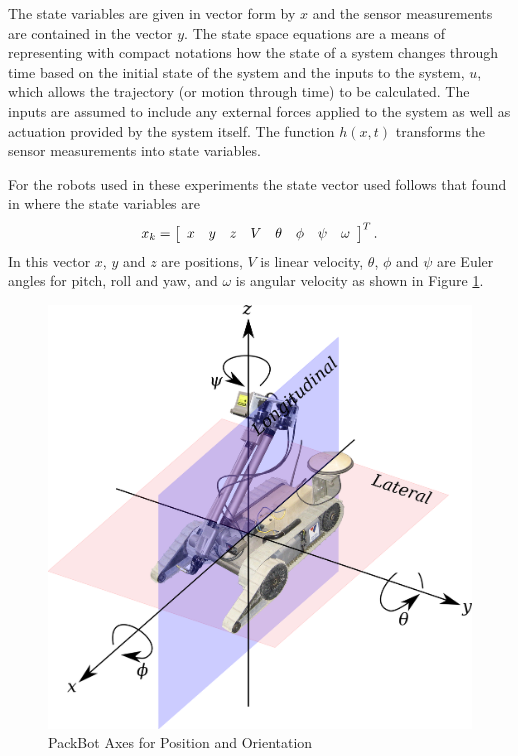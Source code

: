 The state variables are given in vector form by $x$ and the sensor measurements are contained in the vector $y$. The state space equations are a means of representing with compact notations how the state of a system changes through time based on the initial state of the system and the inputs to the system, $u$, which allows the trajectory (or motion through time) to be calculated. The inputs are assumed to include any external forces applied to the system as well as actuation provided by the system itself. The function $h(x,t)$ transforms the sensor measurements into state variables.

For the robots used in these experiments the state vector used follows that found in \cite{Kelly_1994_338, Kelly_1994_333} where the state variables are
\begin{align*}
x_k = \left[\begin{array}{c c c c c c c c} x & y & z & V & \theta & \phi & \psi & \omega \end{array}\right]^T.
\end{align*}
In this vector $x$, $y$ and $z$ are positions, $V$ is linear velocity, $\theta$, $\phi$ and $\psi$ are Euler angles for pitch, roll and yaw, and $\omega$ is angular velocity as shown in Figure \ref{fig:packbotaxes}.

\begin{figure}[ht!]
    \centering
    \includegraphics[width=.8\textwidth]{images/packbotaxes}
    \caption{PackBot Axes for Position and Orientation}
    \label{fig:packbotaxes}
\end{figure}

